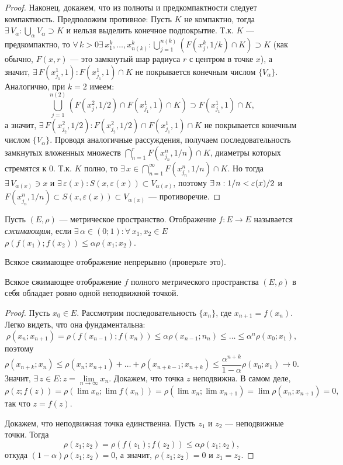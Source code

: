 \documentclass[12pt,titlepage, a4paper]{article}
\begin{document}
\begin{proof}
Наконец, докажем, что из полноты и предкомпактности следует
компактность. Предположим противное: Пусть $K$ не компактно, тогда
$\exists\,V_\alpha: \bigcup\limits_\alpha V_\alpha\supset K$ и
нельзя выделить конечное подпокрытие. Т.к. $K$ --- предкомпактно, то
$\forall\,k>0$\;\;$\exists\,x_1^k,\ldots,x_{n(k)}^k:\bigcup\limits_
{j=1}^{n(k)}(F(x_j^k,1/k)\cap K)\supset K$ (как обычно, $F(x,r)$
--- это замкнутый шар радиуса $r$ с центром в точке $x$), а значит,
$\exists\,F(x_{j_1}^1,1):F(x_{j_1}^1,1)\cap K$ не покрывается
конечным числом $\{V_\alpha\}$. Аналогично, при $k=2$ имеем:
$$\bigcup\limits_{j=1}^{n(2)} (F(x_j^2,1/2)\cap F(x_{j_1}^1,1)\cap K)\supset F(x_{j_1}^1,1)
\cap K,$$ а значит, $\exists\,F(x_{j_2}^2,1/2):F(x_{j_2}^2,1/2)\cap
F(x_{j_1}^1,1)\cap K$ не покрывается конечным числом $\{V_\alpha\}$.
Проводя аналогичные рассуждения, получаем последовательность
замкнутых вложенных множеств $\bigcap\limits_{n=1}^r
F(x^n_{j_n},1/n)\cap K$, диаметры которых стремятся к 0. Т.к. $K$
полно, то $\exists\,x\in\bigcap\limits_{n=1}^\infty
F(x_{j_n}^n,1/n)\cap K$. Но тогда $\exists\,V_{\alpha(x)}\ni x$ и
$\exists\,\varepsilon(x): S(x,\varepsilon(x))\subset V_{\alpha(x)}$,
поэтому $\exists\,n: 1/n\p<\varepsilon(x)/2$ и
$F(x_{j_n}^n,1/n)\subset S(x,\varepsilon(x))\subset V_{\alpha(x)}$
--- противоречие.
\end{proof}

\begin{defen}
Пусть $(E,\rho)$ --- метрическое пространство. Отображение $f\colon
E\to E$ называется \emph{сжимающим}, если
$\exists\,\alpha\in(0;1):\forall\,x_1,x_2\in E$ \;\;
$\rho(f(x_1);f(x_2))\leqslant\alpha\rho(x_1;x_2)$.
\end{defen}

Всякое сжимающее отображение непрерывно (проверьте это).

\begin{theorem}[Пикар]
Всякое сжимающее отображение $f$ полного ме\-трического пространства
$(E,\rho)$ в себя обладает ровно одной неподвижной точкой.
\end{theorem}

\begin{proof}
Пусть $x_0\in E$. Рассмотрим последовательность $\{x_n\}$, где
$x_{n+1}=f(x_n)$. Легко видеть, что она фундаментальна:
$$\rho(x_{n};x_{n+1})=\rho(f(x_{n-1});f(x_n))\leqslant\alpha\rho(x_{n-1};n_n)
\leqslant\ldots\leqslant\alpha^n\rho(x_0;x_1),$$ поэтому
$$\rho(x_{n+k};x_n)\leqslant\rho(x_n;x_{n+1})+\ldots+\rho(x_{n+k-1};x_{n+k})
\leqslant\frac{\alpha^{n+k}}{1-\alpha}\rho(x_0;x_1)\to 0.$$ Значит,
$\exists\,z\in E:z=\lim\limits_{n\to\infty} x_n$. Докажем, что точка
$z$ неподвижна. В самом деле, $$\rho(z;f(z))=\rho(\lim x_n;\lim
f(x_n))=\rho(\lim x_n;\lim x_{n+1})=\lim\rho(x_n;x_{n+1})=0,$$ так
что $z=f(z)$.

Докажем, что неподвижная точка единственна. Пусть $z_1$ и $z_2$ ---
неподвижные точки. Тогда
$$\rho(z_1;z_2)=\rho(f(z_1);f(z_2))\leqslant\alpha\rho(z_1;z_2),$$
откуда $(1-\alpha)\rho(z_1;z_2)=0$, а значит, $\rho(z_1;z_2)=0$ и
$z_1=z_2$.
\end{proof}
\end{document}

